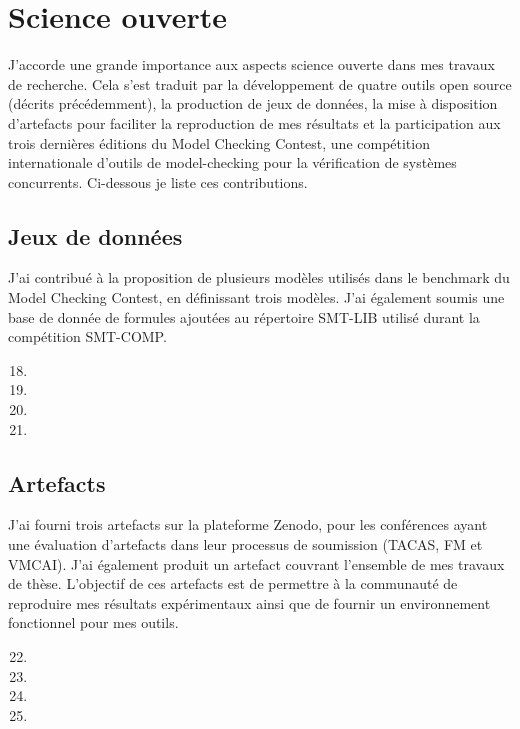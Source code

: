 \section*{Science ouverte}
\vspace{10pt}
J'accorde une grande importance aux aspects \og science ouverte \fg dans mes travaux
de recherche. Cela s'est traduit par la développement de quatre outils open
source (décrits précédemment), la production de jeux de données, la mise à
disposition d'artefacts pour faciliter la reproduction de mes résultats et la
participation aux trois dernières éditions du Model Checking Contest, une
compétition internationale d'outils de model-checking pour la vérification de
systèmes concurrents. Ci-dessous je liste ces contributions.

\vspace{10pt}
\subsection*{Jeux de données}
\vspace{10pt}
J'ai contribué à la proposition de plusieurs modèles utilisés dans le benchmark du Model Checking Contest, en 
définissant trois modèles. J'ai également soumis une base de donnée de formules ajoutées au répertoire SMT-LIB
utilisé durant la compétition SMT-COMP.
\vspace{5pt}
\begin{enumerate}
  \setcounter{enumi}{17}
  \item {}\smallbreak
  \item {}\smallbreak
  \item {}\smallbreak
  \item {}
\end{enumerate}

\vspace{10pt}
\subsection*{Artefacts}
\vspace{5pt}

J'ai fourni trois artefacts sur la plateforme \textsf{Zenodo}, pour les
conférences ayant une évaluation d'artefacts dans leur processus de soumission
(TACAS, FM et VMCAI). J'ai également produit un artefact couvrant l'ensemble de
mes travaux de thèse. L'objectif de ces artefacts est de permettre à la
communauté de reproduire mes résultats expérimentaux ainsi que de fournir un
environnement fonctionnel pour mes outils.
\vspace{1pt}
\begin{enumerate}
  \setcounter{enumi}{21}
  \item {}\smallbreak
  \item {}\smallbreak
  \item {}\smallbreak
  \item {}
\end{enumerate}
\newpage


